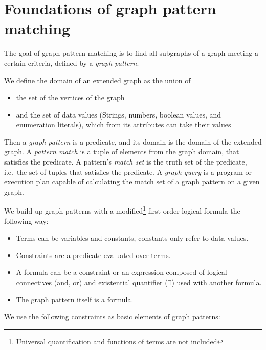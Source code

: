 \section{Foundations of graph pattern matching}
\label{section:gpmc}


The goal of graph pattern matching is to find all subgraphs of a graph meeting a certain criteria, defined by a \emph{graph pattern}.

We define the domain of an extended graph as the union of 
\begin{itemize}
	\item the set of the vertices of the graph
	\item and the set of data values (Strings, numbers, boolean values, and enumeration literals), which from its attributes can take their values
\end{itemize}

Then a \emph{graph pattern} is a predicate, and its  domain is the domain of the extended graph.
A \emph{pattern match} is a tuple of elements from the graph domain, that satisfies the predicate.
A pattern's \emph{match set} is the truth set of the predicate, i.e.\ the set of tuples that satisfies the predicate.
A \emph{graph query} is a program or execution plan capable of calculating the match set of a graph pattern on a given graph. 



We build up graph patterns with a modified\footnote{ Universal quantification and functions of terms are not included } first-order logical formula the following way:
\begin{itemize}
	\item Terms can be variables and constants, constants only refer to data values.
	\item Constraints are a predicate evaluated over terms. 
	\item A formula can be a constraint or an expression composed of logical connectives (and, or) and existential quantifier ($\exists{}$) used with another formula.
	\item The graph pattern itself is a formula.
\end{itemize}

We use the following constraints as basic elements of graph patterns:

